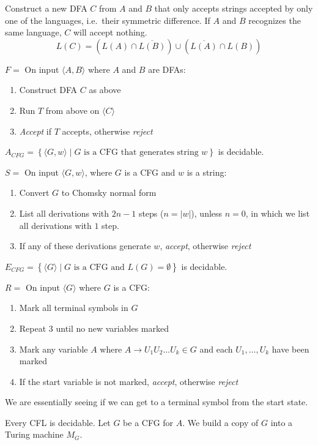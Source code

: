 \documentclass[12 pt]{article}
\begin{document}
Construct a new DFA $C$ from $A$ and $B$ that only accepts strings
accepted by only one of the languages, i.e.\ their symmetric
difference. If $A$ and $B$ recognizes the same language, $C$ will
accept nothing. $$L(C) = (L(A) \cap \overline{L(B)}) \cup
(\overline{L(A)} \cap L(B))$$

$F = $ On input $\langle A,B \rangle$ where $A$ and $B$ are DFAs:
\begin{enumerate}
\item Construct DFA $C$ as above
\item Run $T$ from above on $\langle C \rangle$
\item \textit{Accept} if $T$ accepts, otherwise \textit{reject}
\end{enumerate}
$A_{CFG} = \left\{\langle G,w \rangle \mid G \text{ is a CFG that
    generates string } w\right\}$ is decidable.

$S =$ On input $\langle G,w \rangle$, where $G$ is a CFG and $w$ is a
string:
\begin{enumerate}
\item Convert $G$ to Chomsky normal form
\item List all derivations with $2n-1$ steps ($n = |w|$), unless $n =
  0$, in which we list all derivations with $1$ step.
\item If any of these derivations generate $w$, \textit{accept},
  otherwise \textit{reject}
\end{enumerate}
$E_{CFG} = \left\{\langle G \rangle \mid G \text{ is a CFG and } L(G)
  = \emptyset\right\}$ is decidable.

$R = $ On input $\langle G \rangle$ where $G$ is a CFG:
\begin{enumerate}
\item Mark all terminal symbols in $G$
\item Repeat 3 until no new variables marked
\item Mark any variable $A$ where $A \to U_1U_2 \ldots U_k \in G$ and
  each $U_1, \ldots, U_k$ have been marked
\item If the start variable is not marked, \textit{accept}, otherwise \textit{reject}
\end{enumerate}
We are essentially seeing if we can get to a terminal symbol from the
start state.

Every CFL is decidable. Let $G$ be a CFG for $A$. We build a copy of
$G$ into a Turing machine $M_G$.
\end{document}
